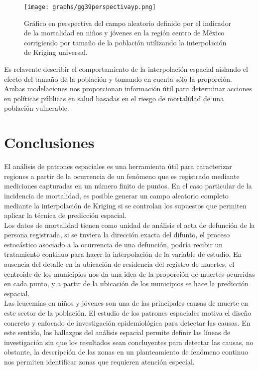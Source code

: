 \documentclass[11pt, oneside]{book}
\begin{document}
\begin{figure}[!ht]
    \centering
    \texttt{[image: graphs/gg39perspectivayp.png]}
  \caption{Gráfico en perspectiva del campo aleatorio definido por el indicador de la mortalidad en niños y jóvenes en la región centro de México corrigiendo por tamaño de la población utilizando la interpolación de Kriging universal.}
  \label{perspyp}
\end{figure}

Es relavente describir el comportamiento de la interpolación espacial aislando el efecto del tamaño de la población y tomando en cuenta sólo la proporción. Ambas modelaciones nos proporcionan información útil para determinar acciones en políticas públicas en salud basadas en el riesgo de mortalidad de una población vulnerable.

\thispagestyle{empty}

\chapter{Conclusiones}

El análisis de patrones espaciales es una herramienta útil para caracterizar regiones a partir de la ocurrencia de un fenómeno que es registrado mediante mediciones capturadas en un número finito de puntos. En el caso particular de la incidencia de mortalidad, es posible generar un campo aleatorio completo mediante la interpolación de Kriging si se controlan los supuestos que permiten aplicar la técnica de predicción espacial.\\

Los datos de mortalidad tienen como unidad de análisis el acta de defunción de la persona registrada, si se tuviera la dirección exacta del difunto, el proceso estocástico asociado a la ocurrencia de una defunción, podría recibir un tratamiento continuo para hacer la interpolación de la variable de estudio. En ausencia del detalle en la ubicación de residencia del registro de muertes, el centroide de los municipios nos da una idea de la proporción de muertes ocurridas en cada punto, y a partir de la ubicación de los municipios se hace la predicción espacial.\\

Las leucemias en niños y jóvenes son una de las principales causas de muerte en este sector de la población. El estudio de los patrones espaciales motiva el diseño concreto y enfocado de investigación epidemiológica para detectar las causas. En este sentido, los hallazgos del análisis espacial permite definir las líneas de investigación sin que los resultados sean concluyentes para detectar las causas, no obstante, la descripción de las zonas en un planteamiento de fenómeno continuo nos permiten identificar zonas que requieren atención especial.\\
\end{document}
